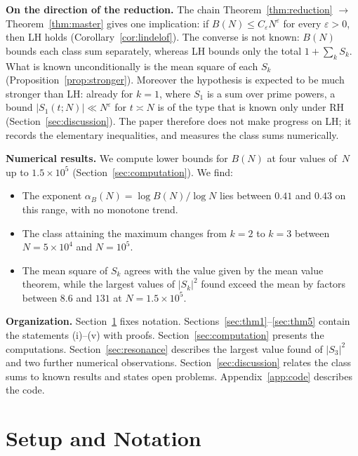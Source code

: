 \documentclass[11pt]{amsart}
\theoremstyle{definition}
\theoremstyle{remark}
\begin{document}
\medskip
\noindent\textbf{On the direction of the reduction.}
The chain Theorem~\ref{thm:reduction} $\to$ Theorem~\ref{thm:master} gives
one implication: if $B(N)\le C_\varepsilon N^\varepsilon$ for every
$\varepsilon>0$, then LH holds (Corollary~\ref{cor:lindelof}).  The
converse is not known: $B(N)$ bounds each class sum separately, whereas LH
bounds only the total $1+\sum_kS_k$.  What is known unconditionally is the
mean square of each $S_k$ (Proposition~\ref{prop:stronger}).  Moreover the
hypothesis is expected to be much stronger than LH: already for $k=1$, where
$S_1$ is a sum over prime powers, a bound $|S_1(t;N)|\ll N^{\varepsilon}$
for $t\asymp N$ is of the type that is known only under RH
(Section~\ref{sec:discussion}).  The paper therefore does not make progress
on LH; it records the elementary inequalities, and measures the class sums
numerically.

\medskip

\noindent\textbf{Numerical results.}
We compute lower bounds for $B(N)$ at four values of~$N$ up to
$1.5 \times 10^5$ (Section~\ref{sec:computation}).  We find:
\begin{itemize}
  \item The exponent $\alpha_B(N)=\log B(N)/\log N$ lies between $0.41$
    and $0.43$ on this range, with no monotone trend.
  \item The class attaining the maximum changes from $k = 2$ to $k = 3$
    between $N=5\times10^4$ and $N = 10^5$.
  \item The mean square of $S_k$ agrees with the value given by the mean
    value theorem, while the largest values of $|S_k|^2$ found exceed the
    mean by factors between $8.6$ and $131$ at $N=1.5\times10^5$.
\end{itemize}

\medskip

\noindent\textbf{Organization.}
Section~\ref{sec:setup} fixes notation.
Sections~\ref{sec:thm1}--\ref{sec:thm5} contain the statements (i)--(v)
with proofs.  Section~\ref{sec:computation} presents the computations.
Section~\ref{sec:resonance} describes the largest value found of $|S_3|^2$
and two further numerical observations.
Section~\ref{sec:discussion} relates the class sums to known results and
states open problems.  Appendix~\ref{app:code} describes the code.

\section{Setup and Notation}\label{sec:setup}
\end{document}
